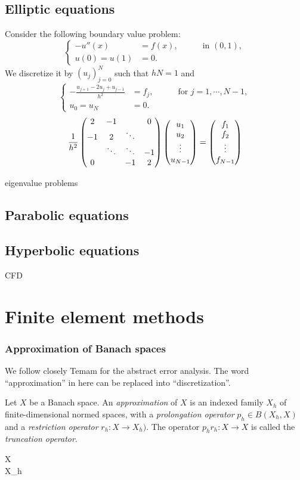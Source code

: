 \documentclass{../../large}
\begin{document}
\section{Elliptic equations}
\begin{prb}
Consider the following boundary value problem:
\[\left\{\begin{alignedat}{2}
-u''(x)&=f(x),&\quad&\text{ in }(0,1),\\
u(0)=u(1)&=0.&&
\end{alignedat}\right.\]
We discretize it by $(u_j)_{j=0}^N$ such that $hN=1$ and
\[\left\{\begin{alignedat}{2}
-\frac{u_{j+1}-2u_j+u_{j-1}}{h^2}&=f_j,&\quad&\text{ for }j=1,\cdots,N-1,\\
u_0=u_N&=0.&&
\end{alignedat}\right.\]
\[\frac1{h^2}\begin{pmatrix}2&-1&&0\\-1&2&\ddots&\\&\ddots&\ddots&-1\\0&&-1&2\end{pmatrix}\begin{pmatrix}u_1\\u_2\\\vdots\\u_{N-1}\end{pmatrix}=\begin{pmatrix}f_1\\f_2\\\vdots\\f_{N-1}\end{pmatrix}\]
\end{prb}
eigenvalue problems

\section{Parabolic equations}


\section{Hyperbolic equations}
CFD

\chapter{Finite element methods}



\subsection{Approximation of Banach spaces}
We follow closely Temam for the abstract error analysis.
The word ``approximation'' in here can be replaced into ``discretization''.

\begin{defn}[Approximation]
Let $X$ be a Banach space.
An \emph{approximation} of $X$ is an indexed family $X_h$ of finite-dimensional normed spaces, with a \emph{prolongation operator} $p_h\in B(X_h,X)$ and a \emph{restriction operator} $r_h:X\to X_h)$.
The operator $p_hr_h:X\to X$ is called the \emph{truncation operator}.
\begin{cd}
X \\ X_h
\end{cd}
\end{defn}
\end{document}
